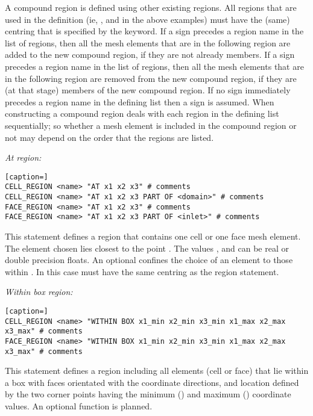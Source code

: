 A compound region is defined using other existing regions.  All regions that are used in the definition (ie, ,  and  in the above examples) must have the (same) centring that is specified by the  keyword.  If a \code{+} sign precedes a region name in the list of regions, then all the mesh elements that are in the following region are added to the new compound region, if they are not already members.  If a \code{-} sign precedes a region name in the list of regions, then all the mesh elements that are in the following region are removed from the new compound region, if they are (at that stage) members of the new compound region.  If no sign immediately precedes a region name in the defining list then a \code{+} sign is assumed.  When constructing a compound region  deals with each region in the defining list sequentially; so whether a mesh element is included in the compound region or not may depend on the order that the regions are listed.

\emph{At region:}

\begin{lstlisting}[caption=]
CELL_REGION <name> "AT x1 x2 x3" # comments
CELL_REGION <name> "AT x1 x2 x3 PART OF <domain>" # comments
FACE_REGION <name> "AT x1 x2 x3" # comments
FACE_REGION <name> "AT x1 x2 x3 PART OF <inlet>" # comments
\end{lstlisting}

This statement defines a region that contains one cell or one face mesh element.  The element chosen lies closest to the point .  The values ,  and  can be real or double precision floats.  An optional  confines the choice of an element to those within .  In this case  must have the same centring as the region statement.

\emph{Within box region:}

\begin{lstlisting}[caption=]
CELL_REGION <name> "WITHIN BOX x1_min x2_min x3_min x1_max x2_max x3_max" # comments
FACE_REGION <name> "WITHIN BOX x1_min x2_min x3_min x1_max x2_max x3_max" # comments
\end{lstlisting}

This statement defines a region including all elements (cell or face) that lie within a box with faces orientated with the coordinate directions, and location defined by the two corner points having the minimum () and maximum () coordinate values.  An optional  function is planned.

